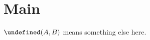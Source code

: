 \let\Hom\undefined
\newcommand{\Hom}{\mathrm{Hom}}
\section{Main}\label{Zed-sec-1}
\begin{theorem}\label{Zed-thm-1}
$\Hom(A,B)$ means something else here.
\end{theorem}
